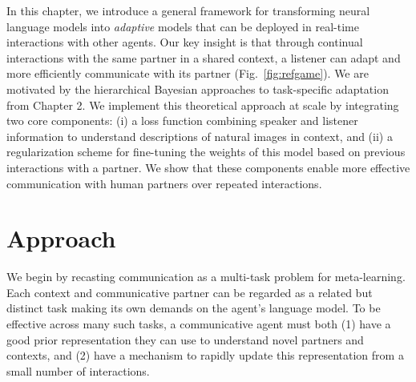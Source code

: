In this chapter, we  introduce a general framework for transforming neural language models into \emph{adaptive} models that can be deployed in real-time interactions with other agents.
Our key insight is that through continual interactions with the same partner in a shared context, a listener can adapt and more efficiently communicate with its partner (Fig.~\ref{fig:refgame}).
We are motivated by the hierarchical Bayesian approaches to task-specific adaptation from Chapter 2. 
We implement this theoretical approach at scale by integrating two core components: (i) a loss function combining speaker and listener information  
to understand descriptions of natural images in context, and (ii) a regularization scheme for fine-tuning the weights of this model based on previous interactions with a partner. %
We show that these components enable more effective communication with human partners over repeated interactions.

\section{Approach}
We begin by recasting communication as a multi-task problem for meta-learning. 
Each context and communicative partner can be regarded as a related but distinct task making its own demands on the agent's language model. 
To be effective across many such tasks, a communicative agent must both (1) have a good prior representation they can use to understand novel partners and contexts, and (2) have a mechanism to rapidly update this representation from a small number of interactions.

